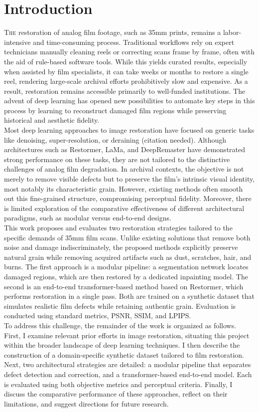\documentclass[10pt,a4paper,twocolumn,twoside]{article}
\begin{document}
\section{Introduction}
\lettrine[lines=3]{T}{he} restoration of analog film footage, such as 35mm prints, remains a labor-intensive and time-consuming process. Traditional workflows rely on expert technicians manually cleaning reels or correcting scans frame by frame, often with the aid of rule-based software tools. While this yields curated results, especially when assisted by film specialists, it can take weeks or months to restore a single reel, rendering large-scale archival efforts prohibitively slow and expensive. As a result, restoration remains accessible primarily to well-funded institutions. The advent of deep learning has opened new possibilities to automate key steps in this process by learning to reconstruct damaged film regions while preserving historical and aesthetic fidelity. \\
Most deep learning approaches to image restoration have focused on generic tasks like denoising, super-resolution, or deraining (citation needed). Although architectures such as Restormer, LaMa, and DeepRemaster have demonstrated strong performance on these tasks, they are not tailored to the distinctive challenges of analog film degradation. In archival contexts, the objective is not merely to remove visible defects but to preserve the film’s intrinsic visual identity, most notably its characteristic grain. However, existing methods often smooth out this fine-grained structure, compromising perceptual fidelity. Moreover, there is limited exploration of the comparative effectiveness of different architectural paradigms, such as modular versus end-to-end designs. \\
This work proposes and evaluates two restoration strategies tailored to the specific demands of 35mm film scans. Unlike existing solutions that remove both noise and damage indiscriminately, the proposed methods explicitly preserve natural grain while removing acquired artifacts such as dust, scratches, hair, and burns. The first approach is a modular pipeline: a segmentation network locates damaged regions, which are then restored by a dedicated inpainting model. The second is an end-to-end transformer-based method based on Restormer, which performs restoration in a single pass. Both are trained on a synthetic dataset that simulates realistic film defects while retaining authentic grain. Evaluation is conducted using standard metrics, PSNR, SSIM, and LPIPS. \\
To address this challenge, the remainder of the work is organized as follows. First, I examine relevant prior efforts in image restoration, situating this project within the broader landscape of deep learning techniques. I then describe the construction of a domain-specific synthetic dataset tailored to film restoration. Next, two architectural strategies are detailed: a modular pipeline that separates defect detection and correction, and a transformer-based end-to-end model. Each is evaluated using both objective metrics and perceptual criteria. Finally, I discuss the comparative performance of these approaches, reflect on their limitations, and suggest directions for future research.
\end{document}
